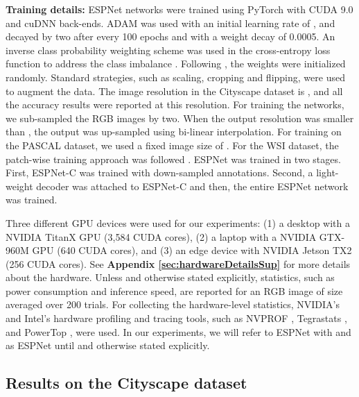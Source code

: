 \documentclass[runningheads]{llncs}
\begin{document}
\noindent \textbf{Training details:} ESPNet networks were trained using PyTorch \cite{paszke2017automatic} with CUDA 9.0 and cuDNN back-ends. ADAM \cite{kingma2014adam} was used with an initial learning rate of , and decayed by two after every 100 epochs and with a weight decay of 0.0005. An inverse class probability weighting scheme was used in the cross-entropy loss function to address the class imbalance \cite{paszke2016enet,romera2018erfnet}. Following \cite{paszke2016enet,romera2018erfnet}, the weights were initialized randomly. Standard strategies, such as scaling, cropping and flipping, were used to augment the data. The image resolution in the Cityscape dataset is , and all the accuracy results were reported at this resolution. For training the networks, we sub-sampled the RGB images by two.  When the output resolution was smaller than , the output was up-sampled using bi-linear interpolation. For training on the PASCAL dataset, we used a fixed image size of . For the WSI dataset, the patch-wise training approach was followed \cite{mehta2017learning}. ESPNet was trained in two stages. First, ESPNet-C was trained with down-sampled annotations. Second, a light-weight decoder was attached to ESPNet-C and then, the entire ESPNet network was trained.

Three different GPU devices were used for our experiments: (1) a  desktop with a NVIDIA TitanX GPU (3,584 CUDA cores), (2) a laptop with a NVIDIA GTX-960M GPU (640 CUDA cores), and (3) an edge device with NVIDIA Jetson TX2 (256 CUDA cores). See \textbf{Appendix \ref{sec:hardwareDetailsSup}} for more details about the hardware. Unless and otherwise stated explicitly, statistics, such as power consumption and inference speed, are reported for an RGB image of size  averaged over 200 trials. For collecting the hardware-level statistics, NVIDIA's and Intel's hardware profiling and tracing tools, such as NVPROF \cite{nvprof}, Tegrastats \cite{tegra}, and PowerTop \cite{powertop}, were used. In our  experiments, we will refer to ESPNet with  and  as ESPNet until and otherwise stated explicitly. 

\subsection{Results on the Cityscape dataset}
\label{ssec:sotaCity}
\end{document}
